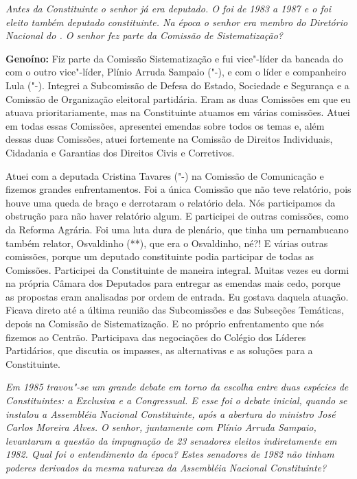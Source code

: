 \emph{Antes da Constituinte o senhor já era deputado. O foi de 1983 a
1987 e o foi eleito também deputado constituinte. Na época o senhor era
membro do Diretório Nacional do . O senhor fez parte da Comissão de
Sistematização?}

\textbf{Genoíno:} Fiz parte da Comissão Sistematização e fui vice"-líder
da bancada do  com o outro vice"-líder, Plínio Arruda Sampaio ("-),
e com o líder e companheiro Lula ("-). Integrei a Subcomissão de
Defesa do Estado, Sociedade e Segurança e a Comissão de Organização
eleitoral partidária. Eram as duas Comissões em que eu atuava
prioritariamente, mas na Constituinte atuamos em várias comissões. Atuei
em todas essas Comissões, apresentei emendas sobre todos os temas e,
além dessas duas Comissões, atuei fortemente na Comissão de Direitos
Individuais, Cidadania e Garantias dos Direitos Civis e Corretivos.

Atuei com a deputada Cristina Tavares ("-) na Comissão de
Comunicação e fizemos grandes enfrentamentos. Foi a única Comissão que
não teve relatório, pois houve uma queda de braço e derrotaram o
relatório dela. Nós participamos da obstrução para não haver relatório
algum. E participei de outras comissões, como da Reforma Agrária. Foi
uma luta dura de plenário, que tinha um pernambucano também relator,
Osvaldinho (**), que era o Osvaldinho, né?! E várias outras comissões,
porque um deputado constituinte podia participar de todas as Comissões.
Participei da Constituinte de maneira integral. Muitas vezes eu dormi na
própria Câmara dos Deputados para entregar as emendas mais cedo, porque
as propostas eram analisadas por ordem de entrada. Eu gostava daquela
atuação. Ficava direto até a última reunião das Subcomissões e das
Subseções Temáticas, depois na Comissão de Sistematização. E no próprio
enfrentamento que nós fizemos ao Centrão. Participava das negociações do
Colégio dos Líderes Partidários, que discutia os impasses, as
alternativas e as soluções para a Constituinte.

\emph{Em 1985 travou"-se um grande debate em torno da escolha entre
duas espécies de Constituintes: a Exclusiva e a Congressual. E esse foi
o debate inicial, quando se instalou a Assembléia Nacional Constituinte,
após a abertura do ministro José Carlos Moreira Alves. O senhor,
juntamente com Plínio Arruda Sampaio, levantaram a questão da impugnação
de 23 senadores eleitos indiretamente em 1982. Qual foi o entendimento
da época? Estes senadores de 1982 não tinham poderes derivados da mesma
natureza da Assembléia Nacional Constituinte?}

